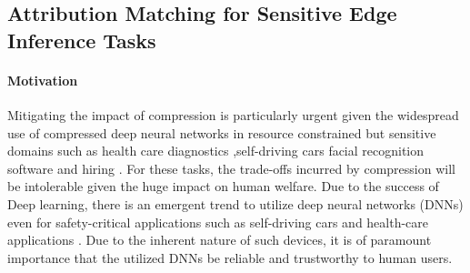 \subsection{Attribution Matching for Sensitive Edge Inference Tasks}

\paragraph{Motivation}
Mitigating the impact of compression is particularly
urgent given the widespread use of compressed deep 
neural networks in resource constrained but sensitive 
domains such as 
%
%
%
health care diagnostics 
\cite{xie2019automated, %
gruetzemacher20183d,    %
badgeley2019deep,       %
oakden2020hidden}       %
%
%
,self-driving cars 
\cite{teslacrash17} %
%
facial recognition software
\cite{
buolamwini2018gender%
} and
%
hiring
\cite{amazon18, 
yourface19}.%
%
%
For these tasks, the trade-offs incurred by 
compression will be intolerable given the huge impact 
on human welfare.
%
Due to the success of Deep learning, there is an 
emergent trend to utilize deep neural networks (DNNs) 
even for safety-critical applications such as 
self-driving cars and health-care applications 
\cite{estava2017dermatologist,
samala2018evolutionary, lane2018deep}.
%
Due to the inherent nature of such devices, 
it is of paramount importance that the utilized 
DNNs be reliable and trustworthy to human users.
%

